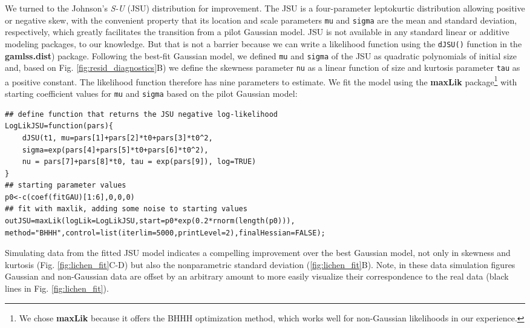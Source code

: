 \documentclass[12pt]{article}
\begin{document}
\begin{spacing}{1.9}
We turned to the Johnson's \emph{S-U} (JSU) distribution for improvement. 
The JSU is a four-parameter leptokurtic distribution allowing positive or negative skew, with the convenient property that its location and scale parameters \texttt{mu} and \texttt{sigma} are the mean and standard deviation, respectively, which greatly facilitates the transition from a pilot Gaussian model. 
JSU is not available in any standard linear or additive modeling packages, to our knowledge. 
But that is not a barrier because we can write a likelihood function using the \texttt{dJSU()} function in the \textbf{gamlss.dist}) package. 
Following the best-fit Gaussian model, we defined \texttt{mu} and \texttt{sigma} of the JSU as quadratic polynomials of initial size and, based on Fig. \ref{fig:resid_diagnostics}B) we define the skewness parameter \texttt{nu} as a linear function of size and kurtosis parameter \texttt{tau} as a positive constant. The likelihood function therefore has nine parameters to estimate.
We fit the model using the \textbf{maxLik} package\footnote{We chose \textbf{maxLik} because it offers the BHHH optimization method, which works well for non-Gaussian likelihoods in our experience.} with starting coefficient values for \texttt{mu} and \texttt{sigma} based on the pilot Gaussian model:
\begin{lstlisting}
## define function that returns the JSU negative log-likelihood
LogLikJSU=function(pars){
	dJSU(t1, mu=pars[1]+pars[2]*t0+pars[3]*t0^2,
	sigma=exp(pars[4]+pars[5]*t0+pars[6]*t0^2),
	nu = pars[7]+pars[8]*t0, tau = exp(pars[9]), log=TRUE)
}
## starting parameter values
p0<-c(coef(fitGAU)[1:6],0,0,0)
## fit with maxlik, adding some noise to starting values
outJSU=maxLik(logLik=LogLikJSU,start=p0*exp(0.2*rnorm(length(p0))),
method="BHHH",control=list(iterlim=5000,printLevel=2),finalHessian=FALSE); 
\end{lstlisting}

Simulating data from the fitted JSU model indicates a compelling improvement over the best Gaussian model, not only in skewness and kurtosis (Fig. \ref{fig:lichen_fit}C-D) but also the nonparametric standard deviation (\ref{fig:lichen_fit}B). 
Note, in these data simulation figures Gaussian and non-Gaussian data are offset by an arbitrary amount to more easily visualize their correspondence to the real data (black lines in Fig. \ref{fig:lichen_fit}).


\end{spacing}
\end{document}

